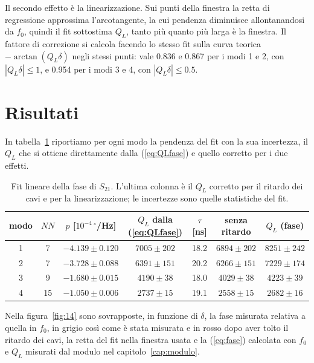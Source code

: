 \documentclass[11pt,a4paper,oneside]{book}
\begin{document}
Il secondo effetto è la linearizzazione. Sui punti della finestra la retta di regressione approssima l'arcotangente, la cui pendenza diminuisce allontanandosi da $f_0$, quindi il fit sottostima $Q_L$, tanto più quanto più larga è la finestra. Il fattore di correzione si calcola facendo lo stesso fit sulla curva teorica $-\arctan(Q_L\delta)$ negli stessi punti: vale 0.836 e 0.867 per i modi 1 e 2, con $|Q_L\delta|\le1$, e 0.954 per i modi 3 e 4, con $|Q_L\delta|\le0.5$.

\section{Risultati}
In tabella~\ref{tab:fase} riportiamo per ogni modo la pendenza del fit con la sua incertezza, il $Q_L$ che si ottiene direttamente dalla (\ref{eq:QLfase}) e quello corretto per i due effetti.

\begin{table}[H]
\centering
\renewcommand{\arraystretch}{1.25}
\small
\begin{tabular}{c c c c c c c}
\hline
modo & $NN$ & $p$ [$10^{-4}\,^\circ$/Hz] & $Q_L$ dalla (\ref{eq:QLfase}) & $\tau$ [ns] & senza ritardo & $Q_L$ (fase) \\ \hline
1 & 7  & $-4.139 \pm 0.120$ & $7005 \pm 202$ & 18.2 & $6894 \pm 202$ & $8251 \pm 242$ \\
2 & 7  & $-3.728 \pm 0.088$ & $6391 \pm 151$ & 20.2 & $6266 \pm 151$ & $7229 \pm 174$ \\
3 & 9  & $-1.680 \pm 0.015$ & $4190 \pm 38$  & 18.0 & $4029 \pm 38$  & $4223 \pm 39$ \\
4 & 15 & $-1.050 \pm 0.006$ & $2737 \pm 15$  & 19.1 & $2558 \pm 15$  & $2682 \pm 16$ \\ \hline
\end{tabular}
\caption{Fit lineare della fase di $S_{21}$. L'ultima colonna è il $Q_L$ corretto per il ritardo dei cavi e per la linearizzazione; le incertezze sono quelle statistiche del fit.}
\label{tab:fase}
\end{table}

Nella figura~\ref{fig:14} sono sovrapposte, in funzione di $\delta$, la fase misurata relativa a quella in $f_0$, in grigio così come è stata misurata e in rosso dopo aver tolto il ritardo dei cavi, la retta del fit nella finestra usata e la (\ref{eq:fase}) calcolata con $f_0$ e $Q_L$ misurati dal modulo nel capitolo~\ref{cap:modulo}.
\end{document}
